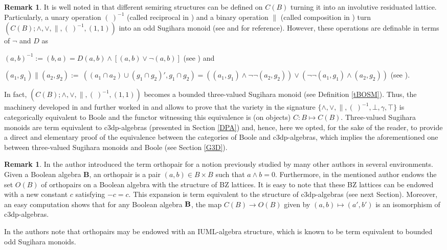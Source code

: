 \documentclass[a4paper,11pt]{article}
\theoremstyle{definition}
\newtheorem{rem}[theorem]{Remark}
\begin{document}
 \begin{rem}
It is well noted in \cite{IR} that different semiring structures can be defined on $C(B)$ turning it into an involutive residuated lattice.
Particularly, a unary operation $(\ )^{-1}$ (called reciprocal in \cite[p. 72]{IR}) and a binary operation $\|$ (called composition in \cite[p. 73]{IR}) turn $(C(B); \wedge, \vee, \|, (\ )^{-1}, (1,1))$ into an odd Sugihara monoid (see \cite{GR12} and \cite{MRW} for reference). 
However, these operations are definable in terms of $\neg$ and $D$ as

$(a,b)^{-1} := (b,a) = D(a,b) \wedge [(a,b) \vee \neg (a,b)]$ (see \cite[p. 72]{IR}) and

$(a_1, g_1) \| (a_2, g_2) := \ ((a_1 \cap a_2) \cup (g_1 \cap g_2)',g_1 \cap g_2) = ((a_1, g_1) \wedge \neg \neg (a_2, g_2)) \vee (\neg \neg (a_1, g_1) \wedge (a_2, g_2))$ (see \cite[p. 73]{IR}).

\noindent In fact, $(C(B); \wedge, \vee, \|, (\ )^{-1}, (1,1))$ becomes a bounded three-valued Sugihara monoid (see Definition \ref{tBOSM}).
Thus, the machinery developed in \cite{GR12} and further worked in \cite{GR15} and \cite{FG} allows to prove that the variety in the signature $\{\wedge, \vee, \|, (\ )^{-1}, \bot, \gamma, \top\}$ is categorically equivalent to Boole and the functor witnessing this equivalence is (on objects) $C:B \mapsto C(B)$. 
Three-valued Sugihara monoids are term equivalent to c3dp-algebras (presented in Section \ref{DPA}) and, hence, here we opted, for the sake of the reader, to provide a direct and elementary proof of the equivalence between the categories of Boole and c3dp-algebras, which implies the aforementioned one between three-valued Sugihara monoids and Boole (see Section \ref{G3D}).
\end{rem}

\begin{rem} \label{RO}
In \cite{DC} the author introduced the term orthopair for a notion previously studied by many other authors in several environments. 
Given a Boolean algebra {\bf{B}}, an orthopair is a pair $(a,b) \in B \times B$ such that $a \wedge b = 0$.
Furthermore, in \cite[Section 3.2]{DC} the mentioned author endows the set $O(B)$ of orthopairs  on a Boolean algebra with the structure of BZ lattices. 
It is easy to note that these BZ lattices can be endowed with a new constant $c$ satisfying $-c = c$. 
This expansion is term equivalent to the structure of c3dp-algebras (see next Section).
Moreover, an easy computation shows that for any Boolean algebra ${\bf{B}}$, the map $C(B) \to O(B)$ given by $(a,b) \mapsto (a',b')$ is an isomorphism of c3dp-algebras.


In \cite{ABCG} the authors note that orthopairs may be endowed with an IUML-algebra structure, which is known to be term equivalent to bounded odd Sugihara monoids. 
\end{rem}
\end{document}
